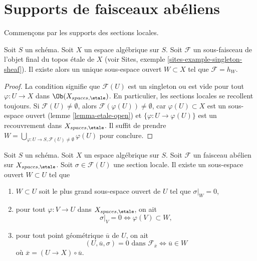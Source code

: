 \section{Supports de faisceaux abéliens}
\label{section-support}

\noindent
Commençons par les supports des sections locales.

\begin{lemma}
\label{lemma-support-subsheaf-final}
Soit $S$ un schéma. Soit $X$ un espace algébrique sur $S$.
Soit $\mathcal{F}$ un sous-faisceau de l'objet final du topos \'etale
de $X$ (voir
Sites, exemple \ref{sites-example-singleton-sheaf}).
Il existe alors un unique sous-espace ouvert
$W \subset X$ tel que $\mathcal{F} = h_W$.
\end{lemma}

\begin{proof}
La condition signifie que $\mathcal{F}(U)$ est un singleton ou
est vide pour tout $\varphi : U \to X$ dans $\Ob(X_{spaces, \etale})$.
En particulier, les sections locales se recollent toujours. Si
$\mathcal{F}(U) \not = \emptyset$, alors
$\mathcal{F}(\varphi(U)) \not = \emptyset$, car
$\varphi(U) \subset X$ est un sous-espace ouvert
(lemme \ref{lemma-etale-open})
et
$\{\varphi : U \to \varphi(U)\}$ est un recouvrement dans $X_{spaces, \etale}$.
Il suffit de prendre
$W = \bigcup_{\varphi : U \to S, \mathcal{F}(U) \not = \emptyset} \varphi(U)$
pour conclure.
\end{proof}

\begin{lemma}
\label{lemma-zero-over-image}
Soit $S$ un schéma.
Soit $X$ un espace algébrique sur $S$.
Soit $\mathcal{F}$ un faisceau abélien sur $X_{spaces, \etale}$.
Soit $\sigma \in \mathcal{F}(U)$ une section locale.
Il existe un sous-espace ouvert $W \subset U$ tel que
\begin{enumerate}
\item $W \subset U$ soit le plus grand sous-espace ouvert de $U$
tel que $\sigma|_W = 0$,
\item pour tout $\varphi : V \to U$ dans $X_{spaces, \etale}$, on ait
$$
\sigma|_V = 0 \Leftrightarrow \varphi(V) \subset W,
$$
\item pour tout point géométrique $\overline{u}$ de $U$, on ait
$$
(U, \overline{u}, \sigma) = 0\text{ dans }\mathcal{F}_{\overline{x}}
\Leftrightarrow
\overline{u} \in W
$$
où $\overline{x} = (U \to X) \circ \overline{u}$.
\end{enumerate}
\end{lemma}


